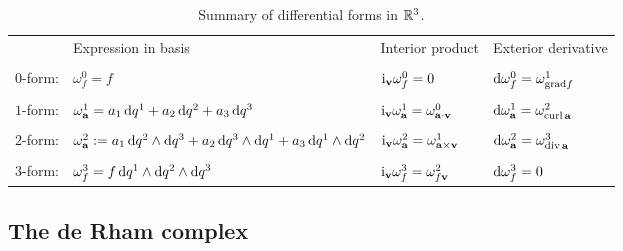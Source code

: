 \documentclass[11pt]{amsart}
\begin{document}
\begin{table}[htb]
 \caption{Summary of differential forms in $\mathbb{R}^3$.} \label{tab:forms}
 \begin{tabular}{|ll|l|l|}
  \hline
  & Expression in basis & Interior product & Exterior derivative \\ 
  & & & \\
 $0$-form: & $\omega^0_f = f$ & $\textnormal i_{\mathbf{v}} \omega^0_f = 0$ &  $\textnormal d \omega^0_f = 
\omega^1_{\textnormal{grad} f}$\\
 & & & \\
 $1$-form: & $\omega^1_{\mathbf{a}} = a_1\,\textnormal d q^1 + a_2\,\textnormal d q^2 + a_3\,\textnormal d q^3$ & $\textnormal i_{\mathbf{v}} 
\omega^1_{\mathbf{a}} = \omega^0_{\mathbf{a} \cdot \mathbf{v}}$ & $\textnormal d \omega^1_{\mathbf{a}} = \omega^2_{\textnormal{curl}\,\mathbf{a}} $ \\
 & & & \\
 $2$-form: & $\omega^2_{\mathbf{a}} := a_1\,\textnormal d q^2 \wedge \textnormal dq^3 +  a_2\,\textnormal d q^3 
\wedge \textnormal dq^1 + a_3\,\textnormal d q^1 \wedge \textnormal dq^2$ & $\textnormal i_{\mathbf{v}} \omega^2_{\mathbf{a}} = \omega^1_{\mathbf{a} 
\times \mathbf{v}}$ & $\textnormal d \omega^2_{\mathbf{a}} = \omega^3_{\textnormal{div}\,\mathbf{a}}$ \\
 & & & \\
 $3$-form: & $\omega^3_f = f\,\textnormal dq^1 \wedge \textnormal d q^2 \wedge \textnormal d q^3$ & $\textnormal i_{\mathbf{v}} 
\omega^3_f = \omega^2_{f\mathbf{v}}$ & $\textnormal d \omega^3_f = 0$\\
  \hline
 \end{tabular}
\end{table}


\subsection{The de Rham complex}
\end{document}
